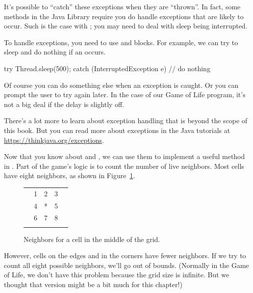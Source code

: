 It's possible to ``catch'' these exceptions when they are ``thrown''.
In fact, some methods in the Java Library require you do handle exceptions that are likely to occur.
Such is the case with ; you may need to deal with sleep being interrupted.

To handle exceptions, you need to use  and  blocks.
For example, we can try to sleep and do nothing if an  occurs.

\begin{code}
try {
    Thread.sleep(500);
} catch (InterruptedException e) {
    // do nothing
}
\end{code}

Of course you can do something else when an exception is caught.
Or you can prompt the user to try again later.
In the case of our Game of Life program, it's not a big deal if the delay is slightly off.

There's a lot more to learn about exception handling that is beyond the scope of this book.
But you can read more about exceptions in the Java tutorials at \url{https://thinkjava.org/exceptions}.

Now that you know about  and , we can use them to implement a useful method in .
Part of the game's logic is to count the number of live neighbors.
Most cells have eight neighbors, as shown in Figure~\ref{fig:neighbors}.

\begin{figure}[!ht]
\begin{center}
\begin{tabular}{|p{1em}|p{1em}|p{1em}|p{1em}|p{1em}|}
\hline
  &   &   &   &   \\
\hline
  & 1 & 2 & 3 &   \\
\hline
  & 4 & * & 5 &   \\
\hline
  & 6 & 7 & 8 &   \\
\hline
  &   &   &   &   \\
\hline
\end{tabular}
\caption{Neighbors for a cell in the middle of the grid.}
\label{fig:neighbors}
\end{center}
\end{figure}

However, cells on the edges and in the corners have fewer neighbors.
If we try to count all eight possible neighbors, we'll go out of bounds.
(Normally in the Game of Life, we don't have this problem because the grid size is infinite.
But we thought that version might be a bit much for this chapter!)

